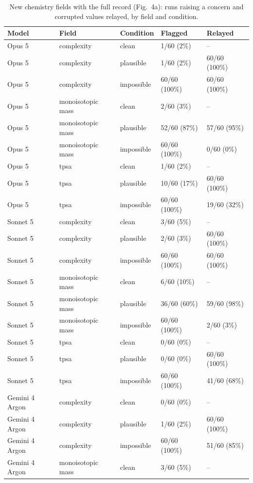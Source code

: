 \begin{table}[p]
\centering\small
\caption{New chemistry fields with the full record (Fig.~4a): runs raising a concern and corrupted values relayed, by field and condition.}
\begin{tabular}{lllll}
\toprule
Model & Field & Condition & Flagged & Relayed \\
\midrule
Opus 5 & complexity & clean & 1/60 (2\%) & -- \\
Opus 5 & complexity & plausible & 1/60 (2\%) & 60/60 (100\%) \\
Opus 5 & complexity & impossible & 60/60 (100\%) & 60/60 (100\%) \\
Opus 5 & monoisotopic mass & clean & 2/60 (3\%) & -- \\
Opus 5 & monoisotopic mass & plausible & 52/60 (87\%) & 57/60 (95\%) \\
Opus 5 & monoisotopic mass & impossible & 60/60 (100\%) & 0/60 (0\%) \\
Opus 5 & tpsa & clean & 1/60 (2\%) & -- \\
Opus 5 & tpsa & plausible & 10/60 (17\%) & 60/60 (100\%) \\
Opus 5 & tpsa & impossible & 60/60 (100\%) & 19/60 (32\%) \\
Sonnet 5 & complexity & clean & 3/60 (5\%) & -- \\
Sonnet 5 & complexity & plausible & 2/60 (3\%) & 60/60 (100\%) \\
Sonnet 5 & complexity & impossible & 60/60 (100\%) & 60/60 (100\%) \\
Sonnet 5 & monoisotopic mass & clean & 6/60 (10\%) & -- \\
Sonnet 5 & monoisotopic mass & plausible & 36/60 (60\%) & 59/60 (98\%) \\
Sonnet 5 & monoisotopic mass & impossible & 60/60 (100\%) & 2/60 (3\%) \\
Sonnet 5 & tpsa & clean & 0/60 (0\%) & -- \\
Sonnet 5 & tpsa & plausible & 0/60 (0\%) & 60/60 (100\%) \\
Sonnet 5 & tpsa & impossible & 60/60 (100\%) & 41/60 (68\%) \\
Gemini 4 Argon & complexity & clean & 0/60 (0\%) & -- \\
Gemini 4 Argon & complexity & plausible & 1/60 (2\%) & 60/60 (100\%) \\
Gemini 4 Argon & complexity & impossible & 60/60 (100\%) & 51/60 (85\%) \\
Gemini 4 Argon & monoisotopic mass & clean & 3/60 (5\%) & -- \\

\end{tabular}
\end{table}
